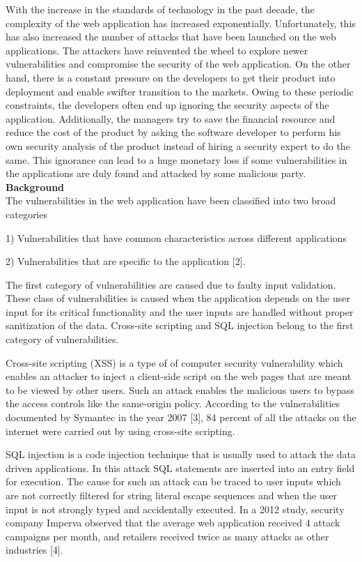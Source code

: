 \documentclass[11pt]{article}
\begin{document}
 With the increase in the standards of technology in the past decade, the complexity of the web application has increased exponentially. Unfortunately, this has also increased the number of attacks that have been launched on the web applications. The attackers have reinvented the wheel to explore newer vulnerabilities and compromise the security of the web application. On the other hand, there is a constant pressure on the developers to get their product into deployment and enable swifter transition to the markets. Owing to these periodic constraints, the developers often end up ignoring the security aspects of the application. Additionally, the managers try to save the financial resource and reduce the cost of the product by asking the software developer to perform his own security analysis of the product instead of hiring a security expert to do the same. This ignorance can lead to a huge monetary loss if some vulnerabilities in the applications are duly found and attacked by some malicious party. \\ 


\textbf{Background}\\
The vulnerabilities in the web application have been classified into two broad categories

1) Vulnerabilities that have common characteristics across different applications

2) Vulnerabilities that are specific to the application [2].

The first category of vulnerabilities are caused due to faulty input validation. These class of vulnerabilities is caused when the application depends on the user input for its critical functionality and the user inputs are handled without proper sanitization of the data. Cross-site scripting and SQL injection belong to the first category of vulnerabilities.

Cross-site scripting (XSS) is a type of of computer security vulnerability which enables an attacker to inject a client-side script on the web pages that are meant to be viewed by other users. Such an attack enables the malicious users to bypass the access controls like the same-origin policy. According to the vulnerabilities documented by Symantec in the year 2007 [3], 84 percent of all the attacks on the internet were carried out by using cross-site scripting.

 SQL injection is a code injection technique that is usually used to attack the data driven applications. In this attack SQL statements are inserted into an entry field for execution. The cause for such an attack can be traced to user inputs which are not correctly filtered for string literal escape sequences and when the user input is not strongly typed and accidentally executed. In a 2012 study, security company Imperva observed that the average web application received 4 attack campaigns per month, and retailers received twice as many attacks as other industries [4]. 
 
\end{document}
